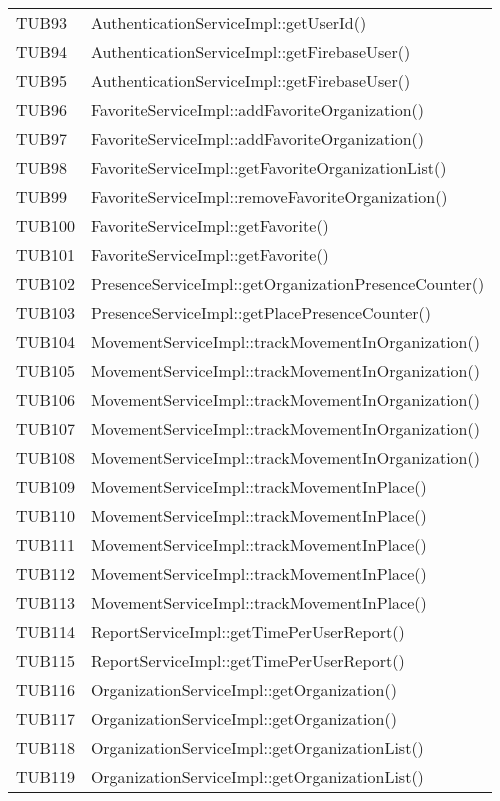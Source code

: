 {\begin{longtable}{C{2cm} C{12cm}}
		TUB93 & AuthenticationServiceImpl::getUserId()\\
		TUB94 & AuthenticationServiceImpl::getFirebaseUser()\\
		TUB95 & AuthenticationServiceImpl::getFirebaseUser()\\
		TUB96 & FavoriteServiceImpl::addFavoriteOrganization()\\
		TUB97 & FavoriteServiceImpl::addFavoriteOrganization()\\
		TUB98 & FavoriteServiceImpl::getFavoriteOrganizationList()\\
		TUB99 & FavoriteServiceImpl::removeFavoriteOrganization()\\
		TUB100 & FavoriteServiceImpl::getFavorite()\\
		TUB101 & FavoriteServiceImpl::getFavorite()\\
		TUB102 & PresenceServiceImpl::getOrganizationPresenceCounter()\\
		TUB103 & PresenceServiceImpl::getPlacePresenceCounter()\\
		TUB104 & MovementServiceImpl::trackMovementInOrganization()\\
		TUB105 & MovementServiceImpl::trackMovementInOrganization()\\
		TUB106 & MovementServiceImpl::trackMovementInOrganization()\\
		TUB107 & MovementServiceImpl::trackMovementInOrganization()\\
		TUB108 & MovementServiceImpl::trackMovementInOrganization()\\
		TUB109 & MovementServiceImpl::trackMovementInPlace()\\
		TUB110 & MovementServiceImpl::trackMovementInPlace()\\
		TUB111 & MovementServiceImpl::trackMovementInPlace()\\
		TUB112 & MovementServiceImpl::trackMovementInPlace()\\
		TUB113 & MovementServiceImpl::trackMovementInPlace()\\
		TUB114 & ReportServiceImpl::getTimePerUserReport()\\
		TUB115 & ReportServiceImpl::getTimePerUserReport()\\
		TUB116 & OrganizationServiceImpl::getOrganization()\\
		TUB117 & OrganizationServiceImpl::getOrganization()\\
		TUB118 & OrganizationServiceImpl::getOrganizationList()\\
		TUB119 & OrganizationServiceImpl::getOrganizationList()\\

\end{longtable}}
